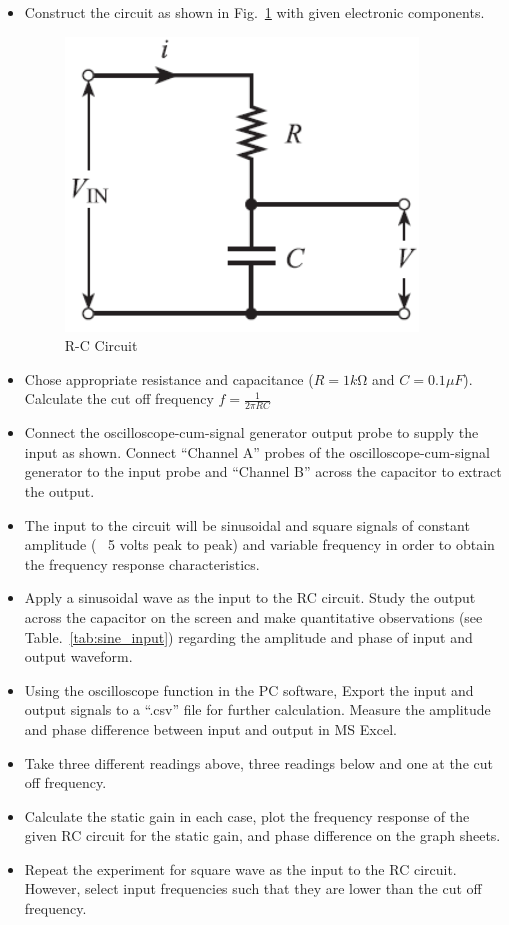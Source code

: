 \documentclass[9pt]{scrreprt}
\begin{document}
\begin{itemize}
\item Construct the circuit as shown in Fig.~\ref{fig:RC_circuit_2} with given electronic components.
\begin{figure}[H]
	\centering
	\includegraphics[width=0.3\linewidth]{logos/RC_circuit_2.PNG}
	\caption{R-C Circuit}
	\label{fig:RC_circuit_2}
\end{figure}
\item Chose appropriate resistance and capacitance ($R = 1 k\si{\ohm}$ and $C = 0.1 \mu F$). Calculate the cut off frequency $f = \frac{1}{2\pi RC}$
\item Connect the oscilloscope-cum-signal generator output probe to supply the input as shown. Connect “Channel A” probes of the oscilloscope-cum-signal generator to the input probe and “Channel B” across the capacitor to extract the output.
\item The input to the circuit will be sinusoidal and square signals of constant amplitude (~ 5 volts peak to peak) and variable frequency in order to obtain the frequency response characteristics.
\item Apply a sinusoidal wave as the input to the RC circuit. Study the output across the capacitor on the screen and make quantitative observations (see Table.~\ref{tab:sine_input}) regarding the amplitude and phase of input and output waveform.
\item Using the oscilloscope function in the PC software, Export the input and output signals to a “.csv” file for further calculation. Measure the amplitude and phase difference between input and output in MS Excel.
\item Take three different readings above, three readings below and one at the cut off frequency.
\item Calculate the static gain in each case, plot the frequency response of the given RC circuit for the static gain, and phase difference on the graph sheets.
\item Repeat the experiment for square wave as the input to the RC circuit. However, select input frequencies such that they are lower than the cut off frequency.


\end{itemize}
\end{document}
